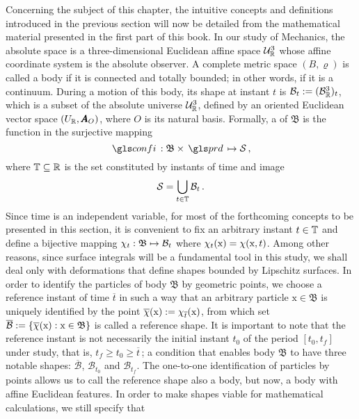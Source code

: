 Concerning the subject of this chapter, the intuitive concepts and definitions introduced in the previous section will now be detailed from the mathematical material presented in the first part of this book. In our study of Mechanics, the absolute space is a three-dimensional Euclidean affine space $\eamd{U}{R}{3}$ whose affine coordinate system is the absolute observer. A complete metric space $(B,\varrho)$ is called a body  if it is connected and totally bounded; in other words, if it is a continuum. During a motion of this body, its shape at instant $t$ is $\mathcal{B}_t:=(\eamd{B}{R}{3})_t$, which is a subset of the absolute universe $\eamd{U}{R}{3}$, defined by an oriented Euclidean vector space $(U_\real,\tnr{A}_O)$, where $O$ is its natural basis. Formally, a  of $\mathfrak{B}$ is the function in the surjective mapping 
\begin{equation}
\map{\gloref{confi}}{\mathfrak{B}\times\gloref{prd}}{\mathcal{S}}\,,
\end{equation}
where $\tempo\subseteq\real$ is the set constituted by instants of time and image 
\begin{equation}
\mathcal{S}=\bigcup_{t\in\tempo}\mathcal{B}_t\,.
\end{equation}
Since time is an independent variable, for most of the forthcoming concepts to be presented in this section, it is convenient to fix an arbitrary instant $t\in\tempo$ and define a bijective mapping $\map{\chi_t}{\mathfrak{B}}{\mathcal{B}_t}$ where $\fua{{\chi_t}}{\text{x}}=\fua{\chi}{\text{x},{t}}$. Among other reasons, since surface integrals will be a fundamental tool in this study, we shall deal only with deformations that define shapes bounded by Lipschitz surfaces. In order to identify the particles of body $\mathfrak{B}$ by geometric points, we choose a reference instant of time $\overline{t}$ in such a way that an arbitrary particle $\text{x}\in\mathfrak{B}$ is uniquely identified by the point $\fua{\overline{\chi}}{\text{x}}:=\fua{\chi_{\overline{t}}}{\text{x}}$, from which set $\overline{\mathcal{B}}:=\{\fua{\overline{\chi}}{\text{x}}:\text{x}\in\mathfrak{B}\}$ is called a reference shape. It is important to note that the reference instant is not necessarily the initial instant $t_0$ of the period $[t_0,t_f]$ under study, that is, $t_f\geqslant t_0\geqslant\overline{t}\,$; a condition that enables body $\mathfrak{B}$ to have three notable shapes: $\overline{\mathcal{B}}$, $\mathcal{B}_{t_0}$ and $\mathcal{B}_{t_f}$. The one-to-one identification of particles by points allows us to call the reference shape also a body, but now, a body with affine Euclidean features. In order to make shapes viable for mathematical calculations, we still specify that
